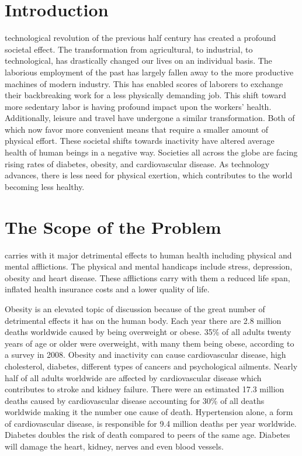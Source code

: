 \documentclass[12pt,journal]{IEEEtran}
\begin{document}
	
		 
	\section{Introduction}
		 technological revolution of the previous half century has created  a profound 
		societal effect. The transformation from agricultural, to industrial, to technological, has drastically 
		changed our lives on an individual basis. The laborious employment of the past has largely fallen away 
		to the more productive machines of modern industry. This has enabled scores of laborers to exchange 
		their backbreaking work for a less physically demanding job. This shift toward more sedentary labor 
		is having profound impact upon the workers’ health. Additionally, leisure and travel have undergone 
		a similar transformation. Both of which now favor more convenient means that require a smaller amount 
		of physical effort. These societal shifts towards inactivity have altered average health of human beings 
		in a negative way. Societies all across the globe are facing rising rates of diabetes, obesity, and 
		cardiovascular disease. As technology advances, there is less need for physical exertion, which contributes 
		to the world becoming less healthy.
		
	\section{The Scope of the Problem}
		 carries with it major detrimental effects to human health including physical and 
		mental afflictions.  The physical and mental handicaps include stress, depression, obesity and heart disease.  
		These afflictions carry with them a reduced life span, inflated health insurance costs and a lower quality of life.
		
		Obesity is an elevated topic of discussion because of the great number of detrimental effects it has on the human body.  
		Each year there are 2.8 million deaths worldwide caused by being overweight or obese.  35\% of all adults twenty years 
		of age or older were overweight, with many them being obese, according to a survey in 2008. \cite{14}  Obesity and 
		inactivity can cause cardiovascular disease, high cholesterol, diabetes, different types of cancers and psychological 
		ailments.  Nearly half of all adults worldwide are affected by cardiovascular disease which contributes to stroke and 
		kidney failure.  There were an estimated 17.3 million deaths caused by cardiovascular disease accounting for 30\% of 
		all deaths worldwide making it the number one cause of death. \cite{4}  Hypertension alone, a form of cardiovascular 
		disease, is responsible for 9.4 million deaths per year worldwide. \cite{3}  Diabetes doubles the risk of death 
		compared to peers of the same age.  Diabetes will damage the heart, kidney, nerves and even blood vessels. \cite{15}
		
\end{document}
